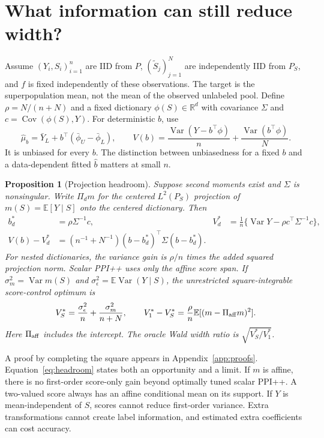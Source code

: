 \documentclass{article}
\newtheorem{proposition}{Proposition}
\newcommand{\E}{\mathbb E}
\newcommand{\Var}{\operatorname{Var}}
\newcommand{\Cov}{\operatorname{Cov}}
\newcommand{\R}{\mathbb R}
\begin{document}
\section{What information can still reduce width?}
\label{sec:theory}
Assume $(Y_i,S_i)_{i=1}^n$ are IID from $P$, $(\widetilde S_j)_{j=1}^N$ are independently IID from $P_S$, and $f$ is fixed independently of these observations. The target is the superpopulation mean, not the mean of the observed unlabeled pool. Define $\rho=N/(n+N)$ and a fixed dictionary $\phi(S)\in\R^d$ with covariance $\Sigma$ and $c=\Cov(\phi(S),Y)$. For deterministic $b$, use
\begin{equation}
 \widehat\mu_b=\bar Y_L+b^\top(\bar\phi_U-\bar\phi_L),\qquad
 V(b)=\frac{\Var(Y-b^\top\phi)}{n}+\frac{\Var(b^\top\phi)}{N}.
 \label{eq:est}
\end{equation}
It is unbiased for every $b$. The distinction between unbiasedness for a fixed $b$ and a data-dependent fitted $\widehat b$ matters at small $n$.

\begin{proposition}[Projection headroom]
\label{prop:projection}
Suppose second moments exist and $\Sigma$ is nonsingular. Write $\Pi_d m$ for the centered $L^2(P_S)$ projection of $m(S)=\E[Y\mid S]$ onto the centered dictionary. Then
\begin{align}
 b_d^*&=\rho\Sigma^{-1}c,&
 V_d^*&=\frac{1}{n}\{\Var Y-\rho c^\top\Sigma^{-1}c\},\label{eq:opt}\\
 V(b)-V_d^*&=(n^{-1}+N^{-1})(b-b_d^*)^\top\Sigma(b-b_d^*).\label{eq:regret}
\end{align}
For nested dictionaries, the variance gain is $\rho/n$ times the added squared projection norm. Scalar PPI++ uses only the affine score span. If $\sigma_m^2=\Var m(S)$ and $\sigma_\epsilon^2=\E\Var(Y\mid S)$, the unrestricted square-integrable score-control optimum is
\begin{equation}
 V_S^*=\frac{\sigma_\epsilon^2}{n}+\frac{\sigma_m^2}{n+N},\qquad
 V_1^*-V_S^*=\frac{\rho}{n}\E[(m-\Pi_{\rm aff}m)^2].
 \label{eq:headroom}
\end{equation}
Here $\Pi_{\rm aff}$ includes the intercept. The oracle Wald width ratio is $\sqrt{V_S^*/V_1^*}$.
\end{proposition}
A proof by completing the square appears in Appendix~\ref{app:proofs}. Equation~\eqref{eq:headroom} states both an opportunity and a limit. If $m$ is affine, there is no first-order score-only gain beyond optimally tuned scalar PPI++. A two-valued score always has an affine conditional mean on its support. If $Y$ is mean-independent of $S$, scores cannot reduce first-order variance. Extra transformations cannot create label information, and estimated extra coefficients can cost accuracy.
\end{document}
